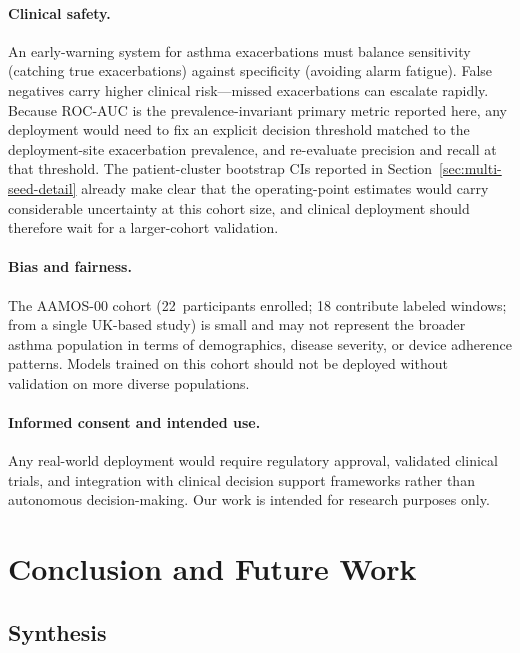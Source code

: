 \documentclass[11pt,a4paper]{article}
\begin{document}
\paragraph{Clinical safety.}
An early-warning system for asthma exacerbations must balance sensitivity
(catching true exacerbations) against specificity (avoiding alarm fatigue).
False negatives carry higher clinical risk---missed exacerbations can
escalate rapidly.  Because ROC-AUC is the prevalence-invariant primary
metric reported here, any deployment would need to fix an explicit
decision threshold matched to the deployment-site exacerbation
prevalence, and re-evaluate precision and recall at that threshold.  The
patient-cluster bootstrap CIs reported in Section~\ref{sec:multi-seed-detail}
already make clear that the operating-point estimates would carry
considerable uncertainty at this cohort size, and clinical deployment
should therefore wait for a larger-cohort validation.

\paragraph{Bias and fairness.}
The AAMOS-00 cohort (22~participants enrolled; 18 contribute labeled windows;
from a single UK-based study) is small and
may not represent the broader asthma population in terms of demographics,
disease severity, or device adherence patterns.  Models trained on this cohort
should not be deployed without validation on more diverse populations.

\paragraph{Informed consent and intended use.}
Any real-world deployment would require regulatory approval, validated clinical
trials, and integration with clinical decision support frameworks rather than
autonomous decision-making.  Our work is intended for research purposes only.

\section{Conclusion and Future Work}\label{sec:conclusion}

\subsection{Synthesis}
\end{document}
